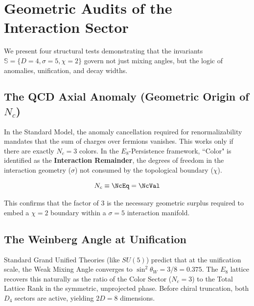 
\section{Geometric Audits of the Interaction Sector}
\label{sec:GeometricAudits}

We present four structural tests demonstrating that the invariants $\mathbb{S} = \{D=4, \sigma=5, \chi=2\}$ govern not just mixing angles, but the logic of anomalies, unification, and decay widths.

\subsection{The QCD Axial Anomaly (Geometric Origin of \texorpdfstring{$N_c$}{Nc})}
In the Standard Model, the anomaly cancellation required for renormalizability mandates that the sum of charges over fermions vanishes. This works only if there are exactly $N_c=3$ colors. In the $E_8$-Persistence framework, ``Color" is identified as the \textbf{Interaction Remainder}, the degrees of freedom in the interaction geometry ($\sigma$) not consumed by the topological boundary ($\chi$).

\begin{equation}
    N_c \equiv \NcEq = \NcVal
\end{equation}

This confirms that the factor of 3 is the necessary geometric surplus required to embed a $\chi=2$ boundary within a $\sigma=5$ interaction manifold.

\subsection{The Weinberg Angle at Unification}
Standard Grand Unified Theories (like $SU(5)$) predict that at the unification scale, the Weak Mixing Angle converges to $\sin^2 \theta_W = 3/8 = 0.375$. The $E_8$ lattice recovers this naturally as the ratio of the Color Sector ($N_c=3$) to the Total Lattice Rank in the symmetric, unprojected phase. Before chiral truncation, both $D_4$ sectors are active, yielding $2D=8$ dimensions.

